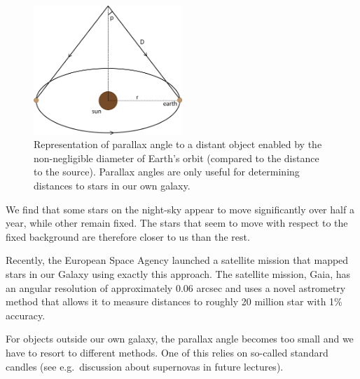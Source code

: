 \documentclass[a4paper,12pt]{article}
\theoremstyle{remark}
\renewcommand{\=}[1]{\stackrel{#1}{=}} %
\theoremstyle{plain}
\theoremstyle{definition}
\begin{document}

\begin{figure}[t]
\begin{center}
    \includegraphics*[angle=0,width=0.5\textwidth]{img/parallax.png}
    \caption[Insert text]{Representation of parallax angle to a distant object enabled by the non-negligible diameter of Earth's orbit (compared to the distance to the source). Parallax angles are only useful for determining distances to stars in our own galaxy.}
\label{fig:parallax}
\end{center}
\end{figure}

We find that some stars on the night-sky appear to move significantly over half a year, while other remain fixed. The stars that seem to move with respect to the fixed background are therefore closer to us than the rest.

Recently, the European Space Agency launched a satellite mission that mapped stars in our Galaxy using exactly this approach. The satellite mission, Gaia, has an angular resolution of approximately $0.06$ arcsec and uses a novel astrometry method that allows it to measure distances to roughly 20 million star with 1\% accuracy.

For objects outside our own galaxy, the parallax angle becomes too small and we have to resort to different methods. One of this relies on so-called standard candles (see e.g.\ discussion about supernovas in future lectures).
\end{document}
